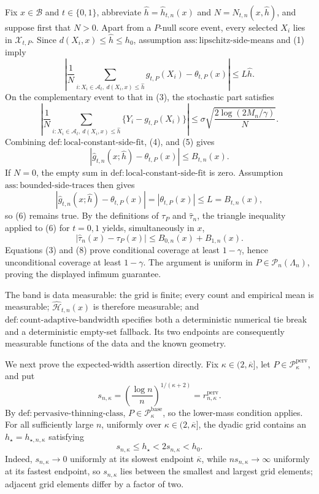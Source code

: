 Fix \(x\in\mathcal B\) and \(t\in\{0,1\}\), abbreviate \(\widehat h=\widehat h_{t,n}(x)\) and \(N=N_{t,n}(x,\widehat h)\), and suppose first that \(N>0\). Apart from a \(P\)-null score event, every selected \(X_i\) lies in \(\mathcal X_{t,P}\). Since \(d(X_i,x)\le\widehat h\le h_0\), assumption \(\mathrm{ass:lipschitz\text{-}side\text{-}means}\) and (1) imply
\[
\left|\frac1N\sum_{i:X_i\in\mathcal A_t,\ d(X_i,x)\le\widehat h}
g_{t,P}(X_i)-\theta_{t,P}(x)\right|
\le L\widehat h. \tag{4}
\]
On the complementary event to that in (3), the stochastic part satisfies
\[
\left|\frac1N\sum_{i:X_i\in\mathcal A_t,\ d(X_i,x)\le\widehat h}
\{Y_i-g_{t,P}(X_i)\}\right|
\le \sigma\sqrt{\frac{2\log(2M_n/\gamma)}{N}}. \tag{5}
\]
Combining \(\mathrm{def:local\text{-}constant\text{-}side\text{-}fit}\), (4), and (5) gives
\[
|\widehat g_{t,n}(x;\widehat h)-\theta_{t,P}(x)|\le B_{t,n}(x). \tag{6}
\]
If \(N=0\), the empty sum in \(\mathrm{def:local\text{-}constant\text{-}side\text{-}fit}\) is zero. Assumption \(\mathrm{ass:bounded\text{-}side\text{-}traces}\) then gives
\[
|\widehat g_{t,n}(x;\widehat h)-\theta_{t,P}(x)|
=|\theta_{t,P}(x)|\le L=B_{t,n}(x), \tag{7}
\]
so (6) remains true. By the definitions of \(\tau_P\) and \(\widehat\tau_n\), the triangle inequality applied to (6) for \(t=0,1\) yields, simultaneously in \(x\),
\[
|\widehat\tau_n(x)-\tau_P(x)|
\le B_{0,n}(x)+B_{1,n}(x). \tag{8}
\]
Equations (3) and (8) prove conditional coverage at least \(1-\gamma\), hence unconditional coverage at least \(1-\gamma\). The argument is uniform in \(P\in\mathcal P_n(\Lambda_n)\), proving the displayed infimum guarantee.

The band is data measurable: the grid is finite; every count and empirical mean is measurable; \(\widehat{\mathcal H}_{t,n}(x)\) is therefore measurable; and \(\mathrm{def:count\text{-}adaptive\text{-}bandwidth}\) specifies both a deterministic numerical tie break and a deterministic empty-set fallback. Its two endpoints are consequently measurable functions of the data and the known geometry.

We next prove the expected-width assertion directly. Fix \(\kappa\in(2,\overline\kappa]\), let \(P\in\mathcal P_{\kappa}^{\mathrm{perv}}\), and put
\[
s_{n,\kappa}=\left(\frac{\log n}{n}\right)^{1/(\kappa+2)}
=r_{n,\kappa}^{\mathrm{perv}}. \tag{9}
\]
By \(\mathrm{def:pervasive\text{-}thinning\text{-}class}\), \(P\in\mathcal P_{\kappa}^{\mathrm{base}}\), so the lower-mass condition applies. For all sufficiently large \(n\), uniformly over \(\kappa\in(2,\overline\kappa]\), the dyadic grid contains an \(h_\star=h_{\star,n,\kappa}\) satisfying
\[
s_{n,\kappa}\le h_\star<2s_{n,\kappa}<h_0. \tag{10}
\]
Indeed, \(s_{n,\kappa}\to0\) uniformly at its slowest endpoint \(\overline\kappa\), while \(ns_{n,\kappa}\to\infty\) uniformly at its fastest endpoint, so \(s_{n,\kappa}\) lies between the smallest and largest grid elements; adjacent grid elements differ by a factor of two.


